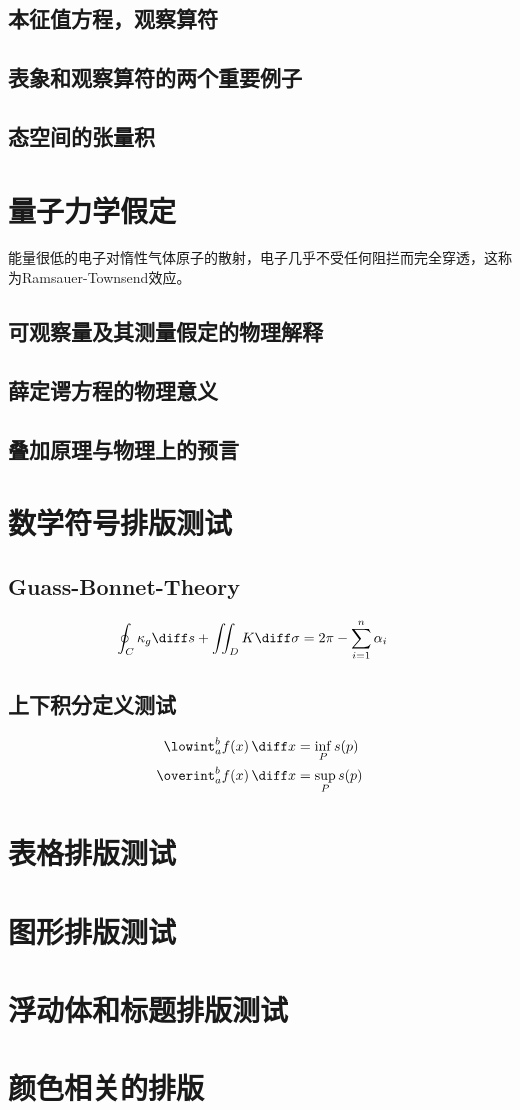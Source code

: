 \subsection{本征值方程，观察算符}%
\subsection{表象和观察算符的两个重要例子}
\subsection{态空间的张量积}
\section{量子力学假定}
能量很低的电子对惰性气体原子的散射，电子几乎不受任何阻拦而完全穿透，这称为Ramsauer-Townsend效应。\cite{Zengshu}
\subsection{可观察量及其测量假定的物理解释}
\subsection{薛定谔方程的物理意义}
\subsection{叠加原理与物理上的预言}
\section{数学符号排版测试}
\subsection{Guass-Bonnet-Theory}
\begin{align}
\oint_C \kappa_g \diff s+\iint_D K \diff \sigma&=2\pi-\sum_{i=1}^n\alpha_i
\end{align}
\subsection{上下积分定义测试}
\begin{align}
\lowint_a^b f(x)\, \diff x&=\inf_P s(p)\\
\overint_a^b f(x)\, \diff x&=\sup_P s(p)
\end{align}
\section{表格排版测试}

\section{图形排版测试}

\section{浮动体和标题排版测试}

\section{颜色相关的排版}



